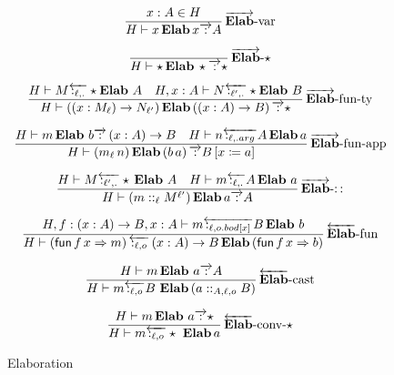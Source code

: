 \begin{figure}
\[
\frac{
 x:A\in H
}{
 H\vdash x\,\textbf{Elab}\,x\overrightarrow{\,:\,}A
}
\operatorname{\overrightarrow{\textbf{Elab}}-var}
\]

\[
\frac{\,}{H\vdash\star\,\textbf{Elab}\,\star\overrightarrow{\,:\,}\star}
\operatorname{\overrightarrow{\textbf{Elab}}-\star}
\]

\[
\frac{
 H\vdash M\overleftarrow{\,:_{\ell,.}\,}\star\textbf{Elab}\ A\quad H,x:A\vdash N\overleftarrow{\,:_{\ell',.}\,}\star\textbf{Elab}\ B
}{
 H\vdash\left(\left(x:M_{\ell}\right)\rightarrow N_{\ell'}\right)\textbf{Elab}\left(\left(x:A\right)\rightarrow B\right)\overrightarrow{\,:\,}\star
}
\operatorname{\overrightarrow{\textbf{Elab}}-fun-ty}
\]

\[
\frac{H\vdash m\,\textbf{Elab}\ b\overrightarrow{\,:\,}\left(x:A\right)\rightarrow B\quad H\vdash n\overleftarrow{\,:_{\ell,.arg}\,}A\,\textbf{Elab}\,a}{H\vdash\left(m_{\ell}\,n\right)\textbf{Elab}\left(b\,a\right)\overrightarrow{\,:\,}B\left[x\coloneqq a\right]}\rulename{\overrightarrow{\textbf{Elab}}-fun-app}
\]

\[
\frac{H\vdash M\overleftarrow{\,:_{\ell',.}\,}\star\,\textbf{Elab}\ A\quad H\vdash m\overleftarrow{\,:_{\ell,.}\,}A\,\textbf{Elab}\ a}{H\vdash\left(m::_{\ell}M^{\ell'}\right)\textbf{Elab}\,a\overrightarrow{\,:\,}A}\rulename{\overrightarrow{\textbf{Elab}}-::}
\]

\[
\frac{H,f:\left(x:A\right)\rightarrow B,x:A\vdash m\overleftarrow{\,:_{\ell,o.bod[x]}\,}B\,\textbf{Elab}\ b}{H\vdash\left(\mathsf{fun}\,f\,x\Rightarrow m\right)\overleftarrow{\,:_{\ell,o}\,}\left(x:A\right)\rightarrow B\,\textbf{Elab}\left(\mathsf{fun}\,f\,x\Rightarrow b\right)}\rulename{\overleftarrow{\textbf{Elab}}-fun}
\]

\[
\frac{H\vdash m\,\textbf{Elab}\ a\overrightarrow{\,:\,}A}{H\vdash m\overleftarrow{\,:_{\ell,o}\,}B\ \textbf{Elab}\left(a::_{A,\ell,o}B\right)}\rulename{\overleftarrow{\textbf{Elab}}-cast}
\]

\[
\frac{H\vdash m\,\textbf{Elab}\ a\overrightarrow{\,:\,}\star}{H\vdash m\overleftarrow{\,:_{\ell,o}\,}\star\ \textbf{Elab}\,a}
\rulename{\overleftarrow{\textbf{Elab}}-conv-\star}
\]


\caption{Elaboration}
\label{fig:elaboration}
\end{figure}

